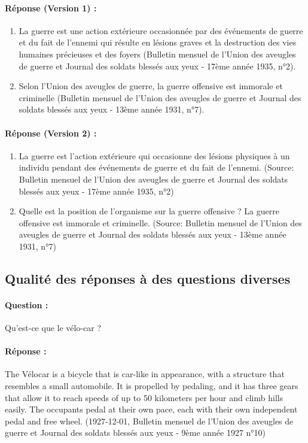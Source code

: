\paragraph{Réponse (Version 1) :}
\begin{enumerate}
\item La guerre est une action extérieure occasionnée par des événements de guerre et du fait de l'ennemi qui résulte en lésions graves et la destruction des vies humaines précieuses et des foyers (Bulletin mensuel de l'Union des aveugles de guerre et Journal des soldats blessés aux yeux - 17ème année 1935, n°2). 
\item Selon l'Union des aveugles de guerre, la guerre offensive est immorale et criminelle (Bulletin mensuel de l'Union des aveugles de guerre et Journal des soldats blessés aux yeux - 13ème année 1931, n°7). 
\end{enumerate}

\paragraph{Réponse (Version 2) :}
\begin{enumerate}
\item La guerre est l'action extérieure qui occasionne des lésions physiques à un individu pendant des événements de guerre et du fait de l'ennemi. (Source: Bulletin mensuel de l'Union des aveugles de guerre et Journal des soldats blessés aux yeux - 17ème année 1935, n°2) 
\item Quelle est la position de l'organisme sur la guerre offensive ? La guerre offensive est immorale et criminelle. (Source: Bulletin mensuel de l'Union des aveugles de guerre et Journal des soldats blessés aux yeux - 13ème année 1931, n°7)
\end{enumerate}

\subsection{Qualité des réponses à des questions diverses} \label{appdx:requetesdiverses}
\paragraph{Question :} Qu'est-ce que le vélo-car ?

\paragraph{Réponse :} The Vélocar is a bicycle that is car-like in appearance, with a structure that resembles a small automobile. It is propelled by pedaling, and it has three gears that allow it to reach speeds of up to 50 kilometers per hour and climb hills easily. The occupants pedal at their own pace, each with their own independent pedal and free wheel. (1927-12-01, Bulletin mensuel de l'Union des aveugles de guerre et Journal des soldats blessés aux yeux - 9ème année 1927 n°10)

